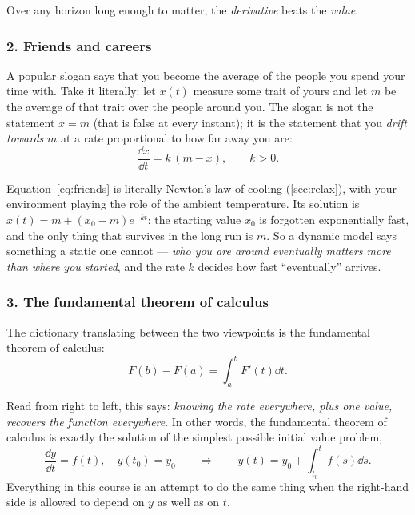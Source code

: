 \begin{moral}
	Over any horizon long enough to matter, the \emph{derivative} beats the
	\emph{value}.
\end{moral}

\subsubsection*{2. Friends and careers}

A popular slogan says that you become the average of the people you spend your time
with. Take it literally: let \(x(t)\) measure some trait of yours and let \(m\) be the
average of that trait over the people around you. The slogan is not the statement
\(x = m\) (that is false at every instant); it is the statement that you \emph{drift
	towards} \(m\) at a rate proportional to how far away you are:
\begin{equation}\label{eq:friends}
	\frac{\dd x}{\dd t} = k\,(m - x), \qquad k > 0.
\end{equation}

\begin{observation}
	Equation~\eqref{eq:friends} is literally Newton's law of cooling
	(\autoref{sec:relax}), with your environment playing the role of the ambient
	temperature. Its solution is
	\(x(t) = m + (x_0 - m) e^{-kt}\): the starting value \(x_0\) is forgotten
	exponentially fast, and the only thing that survives in the long run is \(m\). So a
	dynamic model says something a static one cannot --- \emph{who you are around
		eventually matters more than where you started}, and the rate \(k\) decides how fast
	``eventually'' arrives.
\end{observation}

\subsubsection*{3. The fundamental theorem of calculus}

The dictionary translating between the two viewpoints is the fundamental theorem of
calculus:
\[
	F(b) - F(a) = \int_{a}^{b} F'(t) \dd t.
\]

\begin{intuition}
	Read from right to left, this says: \emph{knowing the rate everywhere, plus one
		value, recovers the function everywhere}. In other words, the fundamental theorem of
	calculus is exactly the solution of the simplest possible initial value problem,
	\[
		\frac{\dd y}{\dd t} = f(t), \quad y(t_0) = y_0
		\qquad\Longrightarrow\qquad
		y(t) = y_0 + \int_{t_0}^{t} f(s) \dd s.
	\]
	Everything in this course is an attempt to do the same thing when the right-hand side
	is allowed to depend on \(y\) as well as on \(t\).
\end{intuition}


